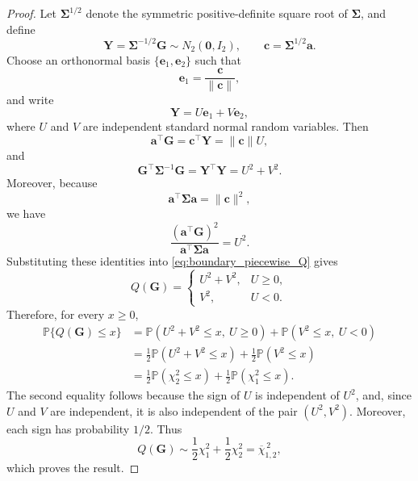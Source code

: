 \documentclass[10pt,a4paper]{amsart}
\newcommand{\Pp}{\mathbb{P}}
\newcommand{\barchi}[2]{\overline{\chi}^{\,2}_{#1,#2}}
\begin{document}
\begin{proof}
Let $\boldsymbol{\Sigma}^{1/2}$ denote the symmetric positive-definite square root of $\boldsymbol{\Sigma}$, and define
$$
\boldsymbol{Y}
=
\boldsymbol{\Sigma}^{-1/2}\boldsymbol{G}
\sim N_2(\boldsymbol{0},I_2),
\qquad
\boldsymbol{c}
=
\boldsymbol{\Sigma}^{1/2}\boldsymbol{a}.
$$
Choose an orthonormal basis
$\{\boldsymbol{e}_1,\boldsymbol{e}_2\}$ such that
$$
\boldsymbol{e}_1
=
\frac{\boldsymbol{c}}{\|\boldsymbol{c}\|},
$$
and write
$$
\boldsymbol{Y}
=
U\boldsymbol{e}_1
+
V\boldsymbol{e}_2,
$$
where $U$ and $V$ are independent standard normal random variables. Then
$$
\boldsymbol{a}^{\top}\boldsymbol{G}
=
\boldsymbol{c}^{\top}\boldsymbol{Y}
=
\|\boldsymbol{c}\|U,
$$
and
$$
\boldsymbol{G}^{\top}
\boldsymbol{\Sigma}^{-1}
\boldsymbol{G}
=
\boldsymbol{Y}^{\top}\boldsymbol{Y}
=
U^2+V^2.
$$
Moreover, because
$$
\boldsymbol{a}^{\top}\boldsymbol{\Sigma}\boldsymbol{a}
=
\|\boldsymbol{c}\|^2,
$$
we have
$$
\frac{
(\boldsymbol{a}^{\top}\boldsymbol{G})^2
}{
\boldsymbol{a}^{\top}\boldsymbol{\Sigma}\boldsymbol{a}
}
=
U^2.
$$
Substituting these identities into
\eqref{eq:boundary_piecewise_Q} gives
$$
Q(\boldsymbol{G})
=
\begin{cases}
U^2+V^2,
&
U\geq 0,
\\
V^2,
&
U<0.
\end{cases}
$$
Therefore, for every $x\geq 0$,
\begin{align*}
\Pp\{Q(\boldsymbol{G})\leq x\}
&=
\Pp(U^2+V^2\leq x,\ U\geq 0)
+
\Pp(V^2\leq x,\ U<0)
\\
&=
\frac{1}{2}\Pp(U^2+V^2\leq x)
+
\frac{1}{2}\Pp(V^2\leq x)
\\
&=
\frac{1}{2}\Pp(\chi_2^2\leq x)
+
\frac{1}{2}\Pp(\chi_1^2\leq x).
\end{align*}
The second equality follows because the sign of $U$ is independent of $U^2$, and, since $U$ and $V$ are independent, it is also independent of the pair $(U^2,V^2)$. Moreover, each sign has probability $1/2$. Thus
$$
Q(\boldsymbol{G})
\sim
\frac{1}{2}\chi_1^2
+
\frac{1}{2}\chi_2^2
=
\barchi{1}{2},
$$
which proves the result.

\end{proof}
\end{document}
